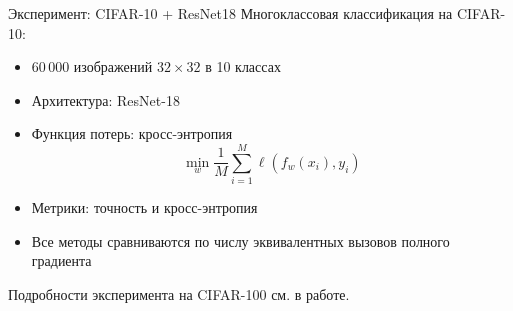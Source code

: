 \documentclass{beamer}
\theoremstyle{plain}
\begin{document}




\begin{frame}{Эксперимент: CIFAR-10 + ResNet18}
    Многоклассовая классификация на CIFAR-10:
    \begin{itemize}
        \item 60\,000 изображений $32\times32$ в 10 классах
        \item Архитектура: ResNet-18
        \item Функция потерь: кросс-энтропия
        \[
        \min\limits_{w} \frac{1}{M} \sum_{i=1}^{M} \ell(f_w(x_i), y_i)
        \]
        \item Метрики: точность и кросс-энтропия
        \item Все методы сравниваются по числу эквивалентных вызовов полного градиента
    \end{itemize}
    \vfill
    \scriptsize
    Подробности эксперимента на CIFAR-100 см. в работе.
\end{frame}
\end{document}

